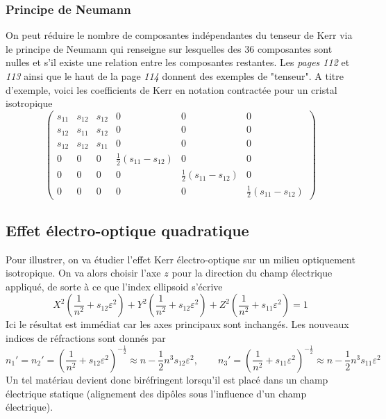 \subsubsection{Principe de Neumann}
On peut réduire le nombre de composantes indépendantes du tenseur de Kerr via le principe de Neumann qui
renseigne sur lesquelles des 36 composantes sont nulles et s'il existe une relation entre les composantes
restantes. Les \textit{pages 112} et \textit{113} ainsi que le haut de la page \textit{114} donnent des
exemples de "tenseur". A titre d'exemple, voici les coefficients de Kerr en notation contractée pour un
cristal isotropique
\begin{equation}
\left(\begin{array}{cccccc}
s_{11}&s_{12}&s_{12}&0&0&0\\
s_{12}&s_{11}&s_{12}&0&0&0\\
s_{12}&s_{12}&s_{11}&0&0&0\\
0&0&0&\frac{1}{2}(s_{11}-s_{12}) &0&0\\
0&0&0&0&\frac{1}{2}(s_{11}-s_{12})&0\\
0&0&0&0&0&\frac{1}{2}(s_{11}-s_{12})
\end{array}\right)
\end{equation}

\subsection{Effet électro-optique quadratique}
Pour illustrer, on va étudier l'effet Kerr électro-optique sur un milieu optiquement isotropique. On va
alors choisir l'axe $z$ pour la direction du champ électrique appliqué, de sorte à ce que l'index ellipsoid
s'écrive
\begin{equation}
X^2\left(\frac{1}{n^2}+s_{12}\varepsilon^2\right)+Y^2\left(\frac{1}{n^2}+s_{12}\varepsilon^2\right)
+Z^2\left(\frac{1}{n^2}+s_{11}\varepsilon^2\right)=1
\end{equation}
Ici le résultat est immédiat car les axes principaux sont inchangés. Les nouveaux indices de réfractions
sont donnés par
\begin{equation}
n_1' = n_2' = \left(\frac{1}{n^2}+s_{12}\varepsilon^2\right)^{-\frac{1}{2}}\approx n-\dfrac{1}{2}n^3s_{12}\varepsilon^2,
\qquad
n_3' = \left(\frac{1}{n^2}+s_{11}\varepsilon^2\right)^{-\frac{1}{2}}\approx n-\dfrac{1}{2}n^3s_{11}\varepsilon^2
\end{equation}
Un tel matériau devient donc biréfringent lorsqu'il est placé dans un champ électrique statique (alignement 
des dipôles sous l'influence d'un champ électrique).


